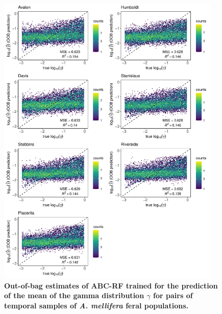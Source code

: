 \documentclass[a4paper, 12pt]{article}
\begin{document}
\begin{figure}[ht]
  \centering
  \includegraphics[width=0.95\textwidth]{Figures/FigureS19_combined_plot_gamma.pdf}
  \small\caption{\textbf{Out-of-bag estimates of ABC-RF trained for the prediction of the mean of the gamma distribution $\gamma$ for pairs of temporal samples of \textit{A. mellifera} feral populations.}}
  \label{fig:supple_feralbee_gammamean}
\end{figure}
\end{document}
